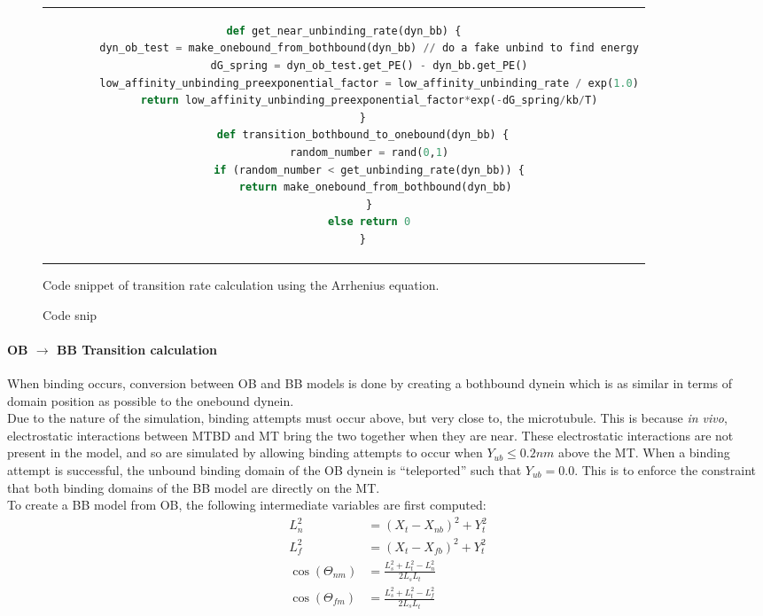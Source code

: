 \documentclass[10pt]{article} %
\begin{document}
\begin{figure}[h!]
  \begin{tabular}{c}
    \begin{lstlisting}[language=python]
      def get_near_unbinding_rate(dyn_bb) {
        dyn_ob_test = make_onebound_from_bothbound(dyn_bb) // do a fake unbind to find energy
        dG_spring = dyn_ob_test.get_PE() - dyn_bb.get_PE()
        low_affinity_unbinding_preexponential_factor = low_affinity_unbinding_rate / exp(1.0)
        return low_affinity_unbinding_preexponential_factor*exp(-dG_spring/kb/T)
      }
      def transition_bothbound_to_onebound(dyn_bb) {
        random_number = rand(0,1)
        if (random_number < get_unbinding_rate(dyn_bb)) {
          return make_onebound_from_bothbound(dyn_bb)
        }
        else return 0
      }
    \end{lstlisting}
  \end{tabular}
  \caption{Code snip}{Code snippet of transition rate calculation using the Arrhenius equation.}
  \label{transition-rate-snippet}
\end{figure}

\paragraph{OB $\rightarrow$ BB Transition calculation}
When binding occurs, conversion between OB and BB models is done by creating a bothbound dynein which is as similar in terms of domain position as possible to the onebound dynein.\\

Due to the nature of the simulation, binding attempts must occur above, but very close to, the microtubule. This is because \textit{in vivo}, electrostatic interactions between MTBD and MT bring the two together when they are near. These electrostatic interactions are not present in the model, and so are simulated by allowing binding attempts to occur when $Y_{ub} \leq 0.2nm$ above the MT. When a binding attempt is successful, the unbound binding domain of the OB dynein is ``teleported'' such that $Y_{ub} = 0.0$. This is to enforce the constraint that both binding domains of the BB model are directly on the MT.\\

To create a BB model from OB, the following intermediate variables are first computed:\\

\begin{align}
  L_n^2 &= \left(X_t - X_{nb}\right)^2 + Y_t^2\\
  L_f^2 &= \left(X_t - X_{fb}\right)^2 + Y_t^2\\
  \cos(\Theta_{nm}) &= \frac{L_s^2 + L_t^2 - L_n^2}{2L_sL_t}\\
  \cos(\Theta_{fm}) &= \frac{L_s^2 + L_t^2 - L_f^2}{2L_sL_t}
\end{align}
\end{document}
